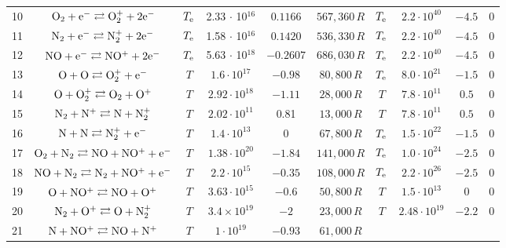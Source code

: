 \documentclass{warpdoc}
\begin{document}
\begin{table}[t]
\begin{center}
\begin{threeparttable}
\begin{tabular}{cccccccccc}
10 & $\rm O_2 + e^- \rightleftarrows O_2^++2e^-$ &$T_{\rm e}$ & 2.33 $\cdot$ 10$^{16}$ & $0.1166$ & $567,360\, R$ 
                                          &$T_{\rm e}$ & $2.2 \cdot 10^{40}$  & $-4.5$  & 0\\
11 & $\rm N_2 + e^- \rightleftarrows N_2^++2e^-$ &$T_{\rm e}$ & 1.58 $\cdot$ 10$^{16}$ & $0.1420$ & $536,330\, R$ 
                                          &$T_{\rm e}$ & $2.2 \cdot 10^{40}$  & $-4.5$  & 0\\
12 & $\rm NO + e^- \rightleftarrows NO^++2e^-$ &$T_{\rm e}$ & 5.63 $\cdot$ 10$^{18}$ & $-0.2607$ & $686,030\, R$ 
                                          &$T_{\rm e}$ & $2.2 \cdot 10^{40}$  & $-4.5$  & 0\\
13 & $\rm O + O \rightleftarrows O_2^{+}+e^-$ &$T$ & $1.6 \cdot 10^{17}$ & $-0.98$ & $80,800 \, R$ 
                                          &$T_{\rm e}$ & $8.0 \cdot 10^{21}$  & $-1.5$  & 0\\
14 & $\rm O + O_2^+ \rightleftarrows O_2+O^+$ &$T$ & $2.92 \cdot 10^{18}$ & $-1.11$ & $28,000\, R$ 
                                          &$T$ & $7.8 \cdot 10^{11}$  & $0.5$  & 0\\
15 & $\rm N_2 + N^+ \rightleftarrows N+N_2^{+}$ &$T$ & $2.02 \cdot 10^{11}$ & 0.81 & $13,000 \, R$ 
                                          &$T$ & $7.8 \cdot 10^{11}$  & $0.5$  & 0\\
16 & $\rm N + N \rightleftarrows N_2^{+} + e^-$ &$T$ & $1.4 \cdot 10^{13}$ & 0 & $67,800\, R$ 
                                          &$T_{\rm e}$ & $1.5 \cdot 10^{22}$  & $-1.5$  & 0\\
17 & $\rm O_2 + N_2 \rightleftarrows NO + NO^+ + e^-$ &$T$ & $1.38 \cdot 10^{20}$ & $-1.84$ & $141,000\, R$ 
                                         &$T_{\rm e}$ & $1.0 \cdot 10^{24}$  & $-2.5$  & 0\\
18 & $\rm NO + N_2 \rightleftarrows N_2 + NO^+ + e^-$ &$T$ & $2.2 \cdot 10^{15}$ & $-0.35$ & $108,000\, R$ 
                                          &$T_{\rm e}$ & $2.2 \cdot 10^{26}$  & $-2.5$  & 0\\
19 & $\rm O + NO^+ \rightleftarrows NO + O^+$ &$T$ & $3.63 \cdot 10^{15}$ & $-0.6$ & $50,800\, R$ 
                                          &$T$ & $1.5 \cdot 10^{13}$  & $0$  & 0\\
20 & $\rm N_2 + O^+ \rightleftarrows O + N_2^{+}$ &$T$ & $3.4 \times 10^{19}$ & $-2$ & $23,000\, R$ 
                                          &$T$ & $2.48 \cdot 10^{19}$  & $-2.2$  & 0\\
21 & $\rm N + NO^+ \rightleftarrows NO + N^+$ &$T$ & $1 \cdot 10^{19}$ & $-0.93$ & $61,000\, R$ 

\end{tabular}
\end{threeparttable}
\end{center}
\end{table}
\end{document}
